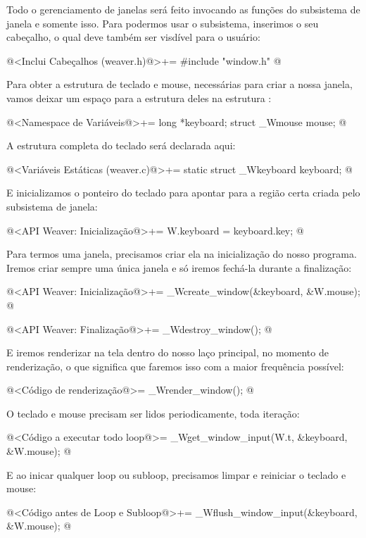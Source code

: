 
Todo o gerenciamento de janelas será feito invocando as funções do
subsistema de janela e somente isso. Para podermos usar o subsistema,
inserimos o seu cabeçalho, o qual deve também ser visdível para o
usuário:

\iniciocodigo
@<Inclui Cabeçalhos (weaver.h)@>+=
#include "window.h"
@
\fimcodigo

Para obter a estrutura de teclado e mouse, necessárias para criar a
nossa janela, vamos deixar um espaço para a estrutura deles na
estrutura :

\iniciocodigo
@<Namespace de Variáveis@>+=
long *keyboard;
struct _Wmouse mouse;
@
\fimcodigo

A estrutura completa do teclado será declarada aqui:

\iniciocodigo
@<Variáveis Estáticas (weaver.c)@>+=
static struct _Wkeyboard keyboard;
@
\fimcodigo

E inicializamos o ponteiro do teclado para apontar para a região certa
criada pelo subsistema de janela:

\iniciocodigo
@<API Weaver: Inicialização@>+=
W.keyboard = keyboard.key;
@
\fimcodigo

Para termos uma janela, precisamos criar ela na inicialização do nosso
programa. Iremos criar sempre uma única janela e só iremos fechá-la
durante a finalização:

\iniciocodigo
@<API Weaver: Inicialização@>+=
_Wcreate_window(&keyboard, &W.mouse);
@
\fimcodigo

\iniciocodigo
@<API Weaver: Finalização@>+=
_Wdestroy_window();
@
\fimcodigo

E iremos renderizar na tela dentro do nosso laço principal, no momento
de renderização, o que significa que faremos isso com a maior
frequência possível:

\iniciocodigo
@<Código de renderização@>=
_Wrender_window();
@
\fimcodigo


O teclado e mouse precisam ser lidos periodicamente, toda iteração:

\iniciocodigo
@<Código a executar todo loop@>=
_Wget_window_input(W.t, &keyboard, &W.mouse);
@
\fimcodigo

E ao inicar qualquer loop ou subloop, precisamos limpar e reiniciar o
teclado e mouse:

\iniciocodigo
@<Código antes de Loop e Subloop@>+=
_Wflush_window_input(&keyboard, &W.mouse);
@
\fimcodigo

